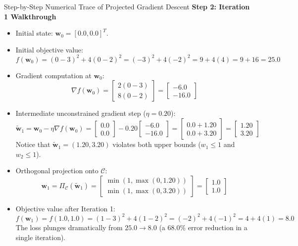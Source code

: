 \begin{examplebox}[breakable]{Step-by-Step Numerical Trace of Projected Gradient Descent}
\textbf{Step 2: Iteration 1 Walkthrough}
\begin{itemize}
    \item Initial state: $\mathbf{w}_0 = [0.0, 0.0]^T$.
    \item Initial objective value:
    \begin{equation}
    f(\mathbf{w}_0) = (0 - 3)^2 + 4(0 - 2)^2 = (-3)^2 + 4(-2)^2 = 9 + 4(4) = 9 + 16 = 25.0
    \end{equation}
    \item Gradient computation at $\mathbf{w}_0$:
    \begin{equation}
    \nabla f(\mathbf{w}_0) = \begin{bmatrix} 2(0 - 3) \\ 8(0 - 2) \end{bmatrix} = \begin{bmatrix} -6.0 \\ -16.0 \end{bmatrix}
    \end{equation}
    \item Intermediate unconstrained gradient step ($\eta = 0.20$):
    \begin{equation}
    \tilde{\mathbf{w}}_1 = \mathbf{w}_0 - \eta \nabla f(\mathbf{w}_0) = \begin{bmatrix} 0.0 \\ 0.0 \end{bmatrix} - 0.20 \begin{bmatrix} -6.0 \\ -16.0 \end{bmatrix} = \begin{bmatrix} 0.0 + 1.20 \\ 0.0 + 3.20 \end{bmatrix} = \begin{bmatrix} 1.20 \\ 3.20 \end{bmatrix}
    \end{equation}
    Notice that $\tilde{\mathbf{w}}_1 = (1.20, 3.20)$ violates both upper bounds ($w_1 \le 1$ and $w_2 \le 1$).
    \item Orthogonal projection onto $\mathcal{C}$:
    \begin{equation}
    \mathbf{w}_1 = \Pi_{\mathcal{C}}(\tilde{\mathbf{w}}_1) = \begin{bmatrix} \min(1, \max(0, 1.20)) \\ \min(1, \max(0, 3.20)) \end{bmatrix} = \begin{bmatrix} 1.0 \\ 1.0 \end{bmatrix}
    \end{equation}
    \item Objective value after Iteration 1:
    \begin{equation}
    f(\mathbf{w}_1) = f(1.0, 1.0) = (1 - 3)^2 + 4(1 - 2)^2 = (-2)^2 + 4(-1)^2 = 4 + 4(1) = 8.0
    \end{equation}
    The loss plunges dramatically from $25.0 \to 8.0$ (a $68.0\%$ error reduction in a single iteration).
\end{itemize}


\end{examplebox}
